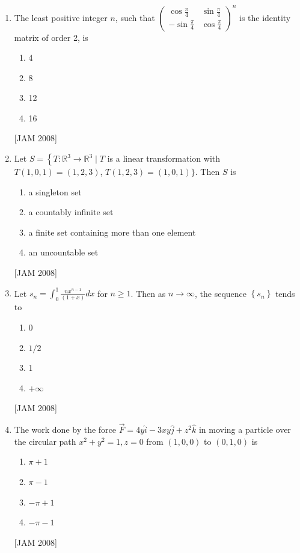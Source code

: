 \begin{enumerate}
   
\item  The least positive integer $n$, such that $\left(\begin{array}{cc}\cos \frac{\pi}{4} & \sin \frac{\pi}{4} \\ -\sin \frac{\pi}{4} & \cos \frac{\pi}{4}\end{array}\right)^{n}$ is the identity matrix of order 2, is
\begin{enumerate}
\item 4  
\item 8 
\item 12 
\item 16
\end{enumerate}
 \hfill [JAM 2008]


\item  Let $S=\left\{T: \mathbb{R}^{3} \rightarrow \mathbb{R}^{3} \mid T\right.$ is a linear transformation with $T(1,0,1)=(1,2,3)$, $T(1,2,3)=(1,0,1)\}$. Then $S$ is 
\begin{enumerate}
\item a singleton set 
\item a countably infinite set 
\item a finite set containing more than one element 
\item an uncountable set
\end{enumerate}
 \hfill [JAM 2008]


\item  Let $s_{n}=\int_{0}^{1} \frac{n x^{n-1}}{(1+x)} d x$ for $n \geq 1$. Then as $n \rightarrow \infty$, the sequence $\left\{s_{n}\right\}$ tends to 

\begin{enumerate}
\item 0 
\item $1 / 2$ 
\item 1 
\item $+\infty$
\end{enumerate}
 \hfill [JAM 2008]


\item  The work done by the force $\vec{F}=4 y \hat{i}-3 x y \hat{j}+z^{2} \hat{k}$ in moving a particle over the circular path $x^{2}+y^{2}=1, z=0$ from $(1,0,0)$ to $(0,1,0)$ is 
\begin{enumerate}
\item $\pi+1$ 
\item $\pi-1$ 
\item $-\pi+1$ 
\item $-\pi-1$
\end{enumerate}
 \hfill [JAM 2008]



\end{enumerate}
